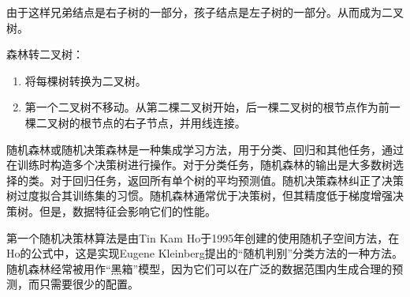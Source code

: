 由于这样兄弟结点是右子树的一部分，孩子结点是左子树的一部分。从而成为二叉树。

森林转二叉树：
\begin{enumerate}
	\item 将每棵树转换为二叉树。
	\item 第一个二叉树不移动。从第二棵二叉树开始，后一棵二叉树的根节点作为前一棵二叉树的根节点的右子节点，并用线连接。
\end{enumerate}

随机森林或随机决策森林是一种集成学习方法，用于分类、回归和其他任务，通过在训练时构造多个决策树进行操作。对于分类任务，随机森林的输出是大多数树选择的类。对于回归任务，返回所有单个树的平均预测值。随机决策森林纠正了决策树过度拟合其训练集的习惯。随机森林通常优于决策树，但其精度低于梯度增强决策树。但是，数据特征会影响它们的性能。\cite{enwiki:1027325967}

第一个随机决策林算法是由Tin Kam Ho于1995年创建的使用随机子空间方法，在Ho的公式中，这是实现Eugene Kleinberg提出的“随机判别”分类方法的一种方法。随机森林经常被用作“黑箱”模型，因为它们可以在广泛的数据范围内生成合理的预测，而只需要很少的配置。



